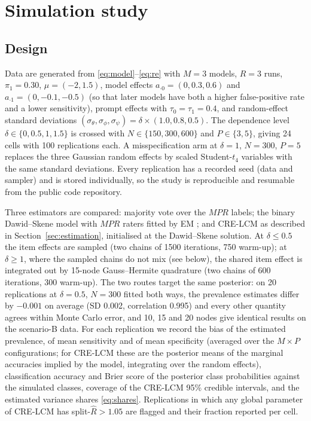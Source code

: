 \section{Simulation study}\label{sec:simulation}

\subsection{Design}\label{sec:sim_design}

Data are generated from \eqref{eq:model}--\eqref{eq:re} with $M = 3$ models, $R = 3$
runs, $\pi_1 = 0.30$, $\mu = (-2, 1.5)$, model effects
$a_{\cdot 0} = (0, 0.3, 0.6)$ and $a_{\cdot 1} = (0, -0.1, -0.5)$ (so that later models
have both a higher false-positive rate and a lower sensitivity), prompt effects with
$\tau_0 = \tau_1 = 0.4$, and random-effect standard deviations
$(\sigma_\theta, \sigma_\phi, \sigma_\psi) = \delta \times (1.0, 0.8, 0.5)$. The
dependence level $\delta \in \{0, 0.5, 1, 1.5\}$ is crossed with $N \in \{150, 300, 600\}$
and $P \in \{3, 5\}$, giving 24 cells with 100 replications each. A misspecification arm
at $\delta = 1$, $N = 300$, $P = 5$ replaces the three Gaussian random effects by
scaled Student-$t_4$ variables with the same standard deviations. Every replication has
a recorded seed (data and sampler) and is stored individually, so the study is
reproducible and resumable from the public code repository.

Three estimators are compared: majority vote over the $M P R$ labels; the binary
Dawid--Skene model with $M P R$ raters fitted by EM \citep{Dawid1979}; and CRE-LCM as
described in Section~\ref{sec:estimation}, initialised at the Dawid--Skene solution. At
$\delta \le 0.5$ the item effects are sampled (two chains of 1500 iterations, 750
warm-up); at $\delta \ge 1$, where the sampled chains do not mix (see below), the shared
item effect is integrated out by 15-node Gauss--Hermite quadrature (two chains of 600
iterations, 300 warm-up). The two routes target the same posterior: on 20 replications at
$\delta = 0.5$, $N = 300$ fitted both ways, the prevalence estimates differ by $-0.001$ on
average (SD 0.002, correlation 0.995) and every other quantity agrees within Monte Carlo
error, and 10, 15 and 20 nodes give identical results on the scenario-B data.
For each replication we record the bias of the estimated prevalence, of mean sensitivity and of mean
specificity (averaged over the $M \times P$ configurations; for CRE-LCM these are the
posterior means of the marginal accuracies implied by the model, integrating over the
random effects), classification accuracy and Brier score of the posterior class
probabilities against the simulated classes, coverage of the CRE-LCM 95\% credible
intervals, and the estimated variance shares \eqref{eq:shares}. Replications in which any
global parameter of CRE-LCM has split-$\widehat{R} > 1.05$ are flagged and their fraction
reported per cell.

